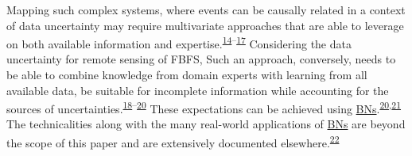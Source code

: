 \documentclass[12pt,oneside]{article}
\begin{document}
Mapping such complex systems, where events can be causally related in a context of data uncertainty may require multivariate approaches that are able to leverage on both available information and expertise.\textsuperscript{\protect\hyperlink{ref-Hubbard_2014}{14}--\protect\hyperlink{ref-Whitney_et_al_2018}{17}} Considering the data uncertainty for remote sensing of FBFS, Such an approach, conversely, needs to be able to combine knowledge from domain experts with learning from all available data, be suitable for incomplete information while accounting for the sources of uncertainties.\textsuperscript{\protect\hyperlink{ref-Kuhnert_2011}{18}--\protect\hyperlink{ref-Whitney_et_al_2018a}{20}} These expectations can be achieved using \href{https://en.wikipedia.org/wiki/Bayesian_network}{BNs}.\textsuperscript{\protect\hyperlink{ref-Whitney_et_al_2018a}{20},\protect\hyperlink{ref-Yet_et_al_2016}{21}} The technicalities along with the many real-world applications of \href{https://en.wikipedia.org/wiki/Bayesian_network}{BNs} are beyond the scope of this paper and are extensively documented elsewhere.\textsuperscript{\protect\hyperlink{ref-Pourret_et_al_2008}{22}}
\end{document}
